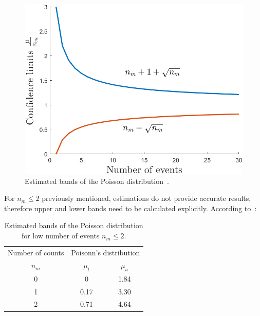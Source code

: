 \begin{figure}[!h]
    \centering
    \includegraphics[width=0.55\columnwidth]{Chapter4/images/poisson.png}
    \caption{Estimated bands of the Poisson distribution~\cite{schmidt}.}
    \label{fig:poisson}
\end{figure}

For $n_{m} \leq 2$ previously mentioned, estimations do not provide accurate results, therefore upper and lower bands need to be calculated explicitly. According to~\cite{schmidt}:



\begin{table}[!h]
\centering
\caption{Estimated bands of the Poisson distribution for low number of events $n_{m}  \leq 2$.}
\begin{tabular}{ccc}
\hline
Number of counts & \multicolumn{2}{c}{Poisonn's distribution} \\ \cline{2-3} 
$n_{m}$          & $\mu_{l}$            & $\mu_{u}$           \\ \hline
0                & 0                    & 1.84                \\
1                & 0.17                & 3.30                \\
2                & 0.71                & 4.64                \\ \hline
\end{tabular}
\end{table}
